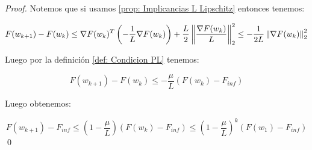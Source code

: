 \begin{proof}
	Notemos que si usamos \ref{prop: Implicancias L Lipschitz} entonces tenemos:
	
	\begin{equation*}
		F(w_{k+1}) - F(w_k) \leq \nabla F(w_k)^T \left(-\frac{1}{L} \nabla F(w_k)\right) + \frac{L}{2} \left\lVert\frac{\nabla F(w_k)}{L}\right\rVert_2^2 \leq -\frac{1}{2L} \left\lVert\nabla F(w_k)\right\rVert_2^2
	\end{equation*}
	
	Luego por la definici\'on \ref{def: Condicion PL} tenemos:
	
	\begin{equation*}
		F(w_{k+1}) - F(w_k) \leq - \frac{\mu}{L} \left(F(w_k) - F_{inf}\right)
	\end{equation*}
	
	Luego obtenemos:
	
	\begin{equation*}
	F(w_{k+1}) - F_{inf} \leq \left(1 - \frac{\mu}{L} \right) \left(F(w_k) - F_{inf}\right) \leq \left(1 - \frac{\mu}{L}\right)^k \left(F(w_1) - F_{inf}\right)
	\end{equation*}\qed
	
	
\end{proof}
